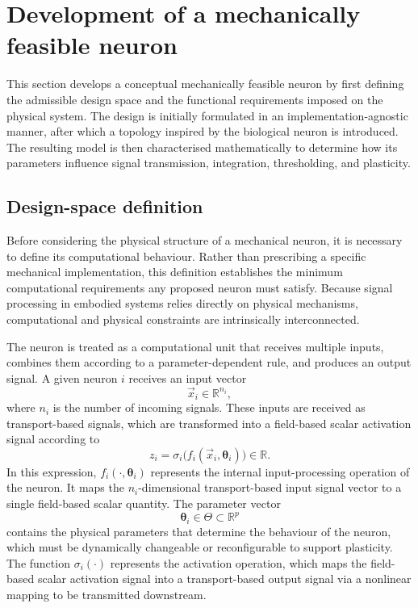 \documentclass[11pt,a4paper]{article}
\numberwithin{equation}{section}
\newcommand{\R}{\mathbb{R}}
\begin{document}
\section{Development of a mechanically feasible neuron}

This section develops a conceptual mechanically feasible neuron by first defining the admissible design space and
the functional requirements imposed on the physical system. The design is initially formulated in an
implementation-agnostic manner, after which a topology inspired by the biological neuron is introduced. The
resulting model is then characterised mathematically to determine how its parameters influence signal transmission,
integration, thresholding, and plasticity.

\subsection{Design-space definition}

Before considering the physical structure of a mechanical neuron, it is necessary to define its computational
behaviour. Rather than prescribing a specific mechanical implementation, this definition establishes the minimum
computational requirements any proposed neuron must satisfy. Because signal processing in embodied systems relies
directly on physical mechanisms, computational and physical constraints are intrinsically interconnected.

The neuron is treated as a computational unit that receives multiple inputs, combines them according to a
parameter-dependent rule, and produces an output signal. A given neuron $i$ receives an input vector
\begin{equation}
  \vec{x}_i \in \R^{n_i},
  \label{eq:input-vector}
\end{equation}
where $n_i$ is the number of incoming signals. These inputs are received as transport-based signals, which are
transformed into a field-based scalar activation signal according to
\begin{equation}
  z_i = \sigma_i\bigl(f_i(\vec{x}_i, \bm{\theta}_i)\bigr) \in \R .
  \label{eq:neuron-map}
\end{equation}
In this expression, $f_i(\cdot, \bm{\theta}_i)$ represents the internal input-processing operation of the neuron.
It maps the $n_i$-dimensional transport-based input signal vector to a single field-based scalar quantity. The
parameter vector
\begin{equation}
  \bm{\theta}_i \in \Theta \subset \R^{p}
  \label{eq:parameters}
\end{equation}
contains the physical parameters that determine the behaviour of the neuron, which must be dynamically changeable
or reconfigurable to support plasticity. The function $\sigma_i(\cdot)$ represents the activation operation, which
maps the field-based scalar activation signal into a transport-based output signal via a nonlinear mapping to be
transmitted downstream.
\end{document}
